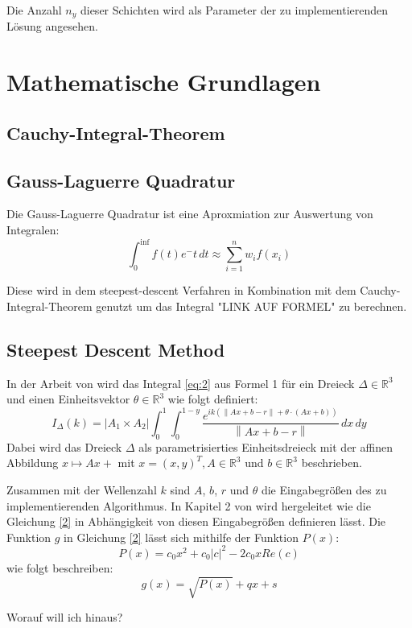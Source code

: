Die Anzahl $n_y$ dieser Schichten wird als Parameter der zu implementierenden Lösung angesehen.




\section{Mathematische Grundlagen}
\subsection{Cauchy-Integral-Theorem}




\subsection{Gauss-Laguerre Quadratur}

Die Gauss-Laguerre Quadratur ist eine Aproxmiation zur Auswertung von Integralen:
\begin{equation}
    \int_{0}^{\inf } f(t) e^-t  \,dt  \approx \sum_{i = 1}^{n} w_if(x_i) 
\end{equation}

Diese wird in dem steepest-descent Verfahren in Kombination mit dem Cauchy-Integral-Theorem genutzt um das Integral "LINK AUF FORMEL" zu berechnen.

\subsection{Steepest Descent Method}

In der Arbeit von \cite{gasperini:hal-03209144} wird das Integral \ref{eq:2} aus Formel 1 für ein Dreieck $\Delta \in \mathbb{R}^3$ und einen Einheitsvektor $\theta \in \mathbb{R}^3$ wie folgt definiert:
\begin{equation}
    I_{\Delta}(k) = | A_1 \times A_2 | \int_{0}^{1} \int_{0}^{1-y} \frac{e^{ik(\left\lVert Ax + b - r\right\rVert+\theta \cdot(Ax +b))}}{\left\lVert Ax + b - r\right\rVert }  \,dx \,dy 
\end{equation}
Dabei wird das Dreieck $\Delta$ als parametrisierties Einheitsdreieck mit der affinen Abbildung $x \mapsto Ax + $ mit $x = (x, y)^T, A \in \mathbb{R}^3$ und $b \in \mathbb{R}^3$ beschrieben.

Zusammen mit der Wellenzahl $k$ sind $A$, $b$, $r$ und $\theta$ die Eingabegrößen des zu implementierenden Algorithmus.
In Kapitel 2 von \cite*{gasperini:hal-03209144} wird hergeleitet wie die Gleichung \ref{2} in Abhängigkeit von diesen Eingabegrößen
definieren lässt.
Die Funktion $g$ in Gleichung \ref{2} lässt sich mithilfe der Funktion $P(x)$: 
\begin{equation}
    P(x) = c_0 x^2 + c_0|c|^2-2c_0xRe(c)
\end{equation}
wie folgt beschreiben:
\begin{equation}
    g(x) = \sqrt{P(x)} + qx + s
\end{equation}

 Worauf will ich hinaus?


